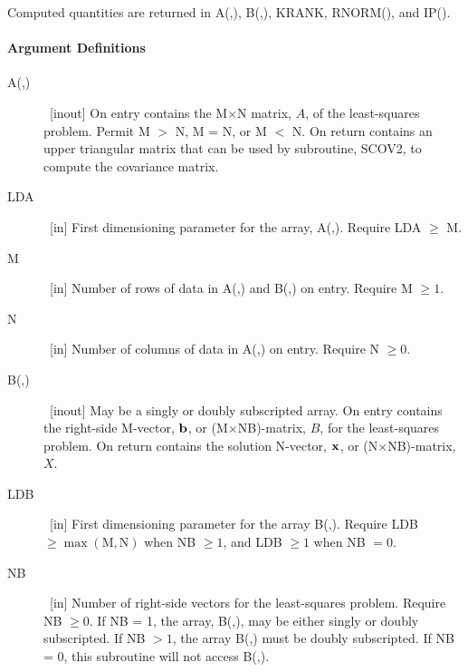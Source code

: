 \documentclass[twoside]{MATH77}
\begin{document}
\begin{center}
\end{center}

Computed quantities are returned in A(,), B(,), KRANK, RNORM(), and IP().

\paragraph{Argument Definitions}

\begin{description}
\item[A(,)]  \ [inout] On entry contains the M$\times $N matrix, $A$, of the
least-squares problem. Permit M $>$ N, M = N, or M $<$ N. On return contains
an upper triangular matrix that can be used by subroutine, SCOV2, to compute
the covariance matrix.

\item[LDA]  \ [in] First dimensioning parameter for the array, A(,). Require
LDA $\geq $ M.

\item[M]  \ [in] Number of rows of data in A(,) and B(,) on entry. Require
M $\geq 1.$

\item[N]  \ [in] Number of columns of data in A(,) on entry. Require N $\geq
0.$

\item[B(,)]  \ [inout] May be a singly or doubly subscripted array. On entry
contains the right-side M-vector, ${\bf b}$, or (M$\times $NB)-matrix, $B$,
for the least-squares problem. On return contains the solution N-vector, $%
{\bf x}$, or (N$\times $NB)-matrix, $X$.

\item[LDB]  \ [in] First dimensioning parameter for the array B(,). Require
LDB $\geq \max (\text{M},\text{N})$ when NB $\geq 1$, and LDB $\geq 1$
when NB $=0.$

\item[NB]  \ [in] Number of right-side vectors for the least-squares
problem. Require NB $\geq 0$. If NB = 1, the array, B(,), may be either
singly or doubly subscripted. If NB $>1$, the array B(,) must be doubly
subscripted. If NB = 0, this subroutine will not access B(,).


\end{description}
\end{document}
